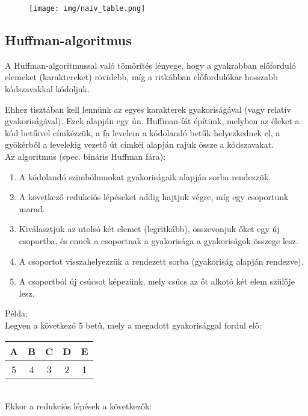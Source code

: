 \documentclass[margin=0px]{article}
\begin{document}
\begin{figure}[H]
    \centering
    \texttt{[image: img/naiv\_table.png]}
\end{figure}

\subsection{Huffman-algoritmus}
A Huffman-algoritmussal való tömörítés lényege, hogy a gyakrabban előforduló elemeket (karaktereket) rövidebb, míg a ritkábban előfordulókar hosszabb kódszavakkal kódoljuk.

Ehhez tisztában kell lennünk az egyes karakterek gyakoriságával (vagy relatív gyakoriságával). Ezek alapján  egy ún. Huffman-fát építünk, melyben az éleket a kód betűivel címkézzük, a fa levelein a kódolandó betűk helyezkednek el, a gyökérből a levelekig vezető út címkéi alapján rajuk össze a kódszavakat.\\

\noindent
Az algoritmus (spec. bináris Huffman fára):
\begin{enumerate}
    \item A kódolandó szimbólumokat gyakoriságaik alapján sorba rendezzük.
    \item A következő redukciós lépéseket addig hajtjuk végre, míg egy csoportunk marad.
    \item Kiválasztjuk az utolsó két elemet (legritkább), összevonjuk őket egy új csoportba, és ennek a csoportnak a gyakorisága a gyakoriságok összege lesz.
    \item A csoportot visszahelyezzük a rendezett sorba (gyakoriság alapján rendezve).
    \item A csoportból új csúcsot képezünk, mely csúcs az őt alkotó két elem szülője lesz.
\end{enumerate}

\noindent
Példa:\\
Legyen a következő 5 betű, mely a megadott gyakorisággal fordul elő:\\

\begin{tabular}{|c|c|c|c|c|}
    \hline A & B & C & D & E \\
    \hline 5 & 4 & 3 & 2 & 1 \\
    \hline
\end{tabular}\\

Ekkor a redukciós lépések a következők:
\end{document}
